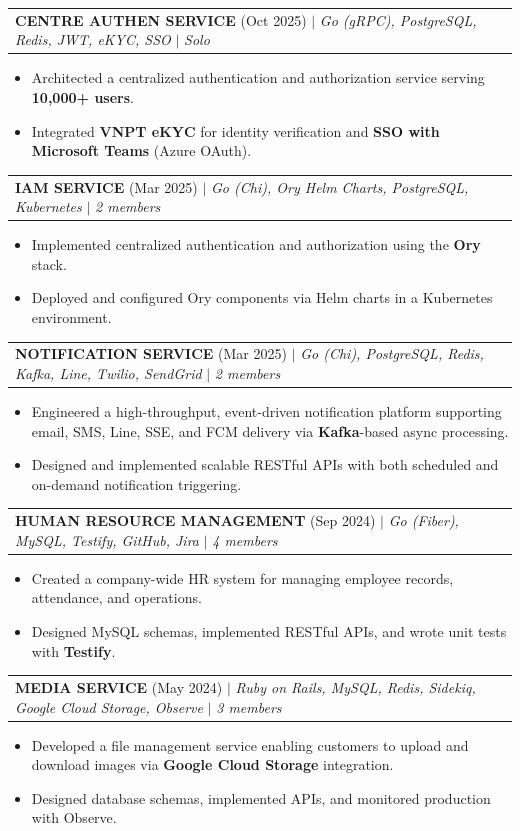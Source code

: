 \documentclass[a4paper,11pt]{article}
\makeatletter
\newcommand{\resumeItem}[1]{
  \item\small{
    {#1 \vspace{-3pt}}
  }
}
\newcommand{\resumeProjectHeading}[2]{
    \item
    \begin{tabular*}{1.001\textwidth}{l@{\extracolsep{\fill}}r}
      \small#1 & \textbf{\small #2}\\
    \end{tabular*}\vspace{-9pt}
}
\newcommand{\resumeItemListStart}{\begin{itemize}}
\newcommand{\resumeItemListEnd}{\end{itemize}\vspace{-8pt}}
\makeatother
\begin{document}
      \resumeProjectHeading
          {\textbf{CENTRE AUTHEN SERVICE} (Oct 2025) $|$ \emph{Go (gRPC), PostgreSQL, Redis, JWT, eKYC, SSO} $|$ \emph{Solo}}{}
          \resumeItemListStart
            \resumeItem{Architected a centralized authentication and authorization service serving \textbf{10,000+ users}.}
            \resumeItem{Integrated \textbf{VNPT eKYC} for identity verification and \textbf{SSO with Microsoft Teams} (Azure OAuth).}
          \resumeItemListEnd
          \vspace{2pt}

      \resumeProjectHeading
          {\textbf{IAM SERVICE} (Mar 2025) $|$ \emph{Go (Chi), Ory Helm Charts, PostgreSQL, Kubernetes} $|$ \emph{2 members}}{}
          \resumeItemListStart
            \resumeItem{Implemented centralized authentication and authorization using the \textbf{Ory} stack.}
            \resumeItem{Deployed and configured Ory components via Helm charts in a Kubernetes environment.}
          \resumeItemListEnd
          \vspace{2pt}

      \resumeProjectHeading
          {\textbf{NOTIFICATION SERVICE} (Mar 2025) $|$ \emph{Go (Chi), PostgreSQL, Redis, Kafka, Line, Twilio, SendGrid} $|$ \emph{2 members}}{}
          \resumeItemListStart
            \resumeItem{Engineered a high-throughput, event-driven notification platform supporting email, SMS, Line, SSE, and FCM delivery via \textbf{Kafka}-based async processing.}
            \resumeItem{Designed and implemented scalable RESTful APIs with both scheduled and on-demand notification triggering.}
          \resumeItemListEnd
          \vspace{2pt}

      \resumeProjectHeading
          {\textbf{HUMAN RESOURCE MANAGEMENT} (Sep 2024) $|$ \emph{Go (Fiber), MySQL, Testify, GitHub, Jira} $|$ \emph{4 members}}{}
          \resumeItemListStart
            \resumeItem{Created a company-wide HR system for managing employee records, attendance, and operations.}
            \resumeItem{Designed MySQL schemas, implemented RESTful APIs, and wrote unit tests with \textbf{Testify}.}
          \resumeItemListEnd
          \vspace{2pt}

      \resumeProjectHeading
          {\textbf{MEDIA SERVICE} (May 2024) $|$ \emph{Ruby on Rails, MySQL, Redis, Sidekiq, Google Cloud Storage, Observe} $|$ \emph{3 members}}{}
          \resumeItemListStart
            \resumeItem{Developed a file management service enabling customers to upload and download images via \textbf{Google Cloud Storage} integration.}
            \resumeItem{Designed database schemas, implemented APIs, and monitored production with Observe.}
          \resumeItemListEnd
          \vspace{2pt}
\end{document}
